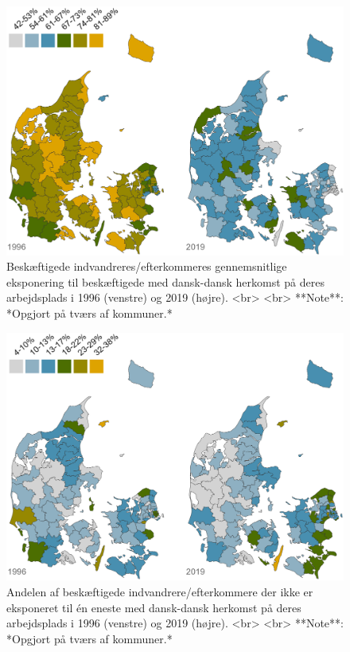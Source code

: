 \documentclass[
]{book}
\begin{document}
\begin{figure}
\includegraphics[width=1\linewidth]{images/Figur_4_4} \caption{Beskæftigede indvandreres/efterkommeres gennemsnitlige eksponering til beskæftigede med dansk-dansk herkomst på deres arbejdsplads i 1996 (venstre) og 2019 (højre). <br> <br> **Note**: *Opgjort på tværs af kommuner.*}\label{fig:fig-4-4}
\end{figure}

\begin{figure}
\includegraphics[width=1\linewidth]{images/Figur_4_5} \caption{Andelen af beskæftigede indvandrere/efterkommere der ikke er eksponeret til én eneste med dansk-dansk herkomst på deres arbejdsplads i 1996 (venstre) og 2019 (højre). <br> <br> **Note**: *Opgjort på tværs af kommuner.*}\label{fig:fig-4-5}
\end{figure}
\end{document}

